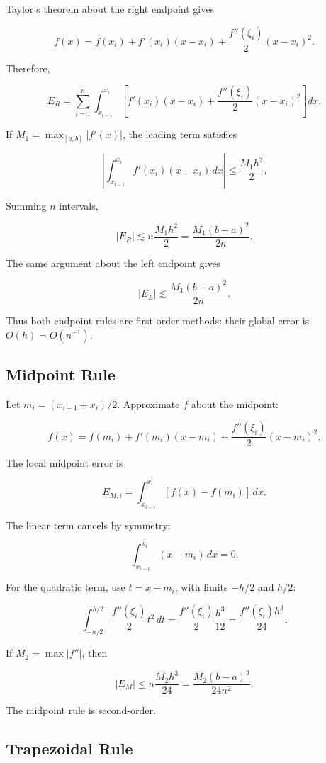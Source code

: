 \documentclass[12pt, a4paper]{article}
\theoremstyle{break}
\begin{document}
Taylor's theorem about the right endpoint gives

\[
f(x)=f(x_i)+f'(x_i)(x-x_i)+\frac{f''(\xi_i)}{2}(x-x_i)^2.
\]

Therefore,

\[
E_R=\sum_{i=1}^n\int_{x_{i-1}}^{x_i}
\left[f'(x_i)(x-x_i)+\frac{f''(\xi_i)}2(x-x_i)^2\right]dx.
\]

If \(M_1=\max_{[a,b]}|f'(x)|\), the leading term satisfies

\[
\left|\int_{x_{i-1}}^{x_i}f'(x_i)(x-x_i)\,dx\right|
\le \frac{M_1h^2}{2}.
\]

Summing \(n\) intervals,

\[
|E_R|\lesssim n\frac{M_1h^2}{2}
=\frac{M_1(b-a)^2}{2n}.
\]

The same argument about the left endpoint gives

\[
|E_L|\lesssim\frac{M_1(b-a)^2}{2n}.
\]

Thus both endpoint rules are first-order methods: their global error is \(O(h)=O(n^{-1})\).

\subsection{Midpoint Rule}\label{midpoint-rule}

Let \(m_i=(x_{i-1}+x_i)/2\). Approximate \(f\) about the midpoint:

\[
f(x)=f(m_i)+f'(m_i)(x-m_i)+\frac{f''(\xi_i)}2(x-m_i)^2.
\]

The local midpoint error is

\[
E_{M,i}=\int_{x_{i-1}}^{x_i}[f(x)-f(m_i)]\,dx.
\]

The linear term cancels by symmetry:

\[
\int_{x_{i-1}}^{x_i}(x-m_i)\,dx=0.
\]

For the quadratic term, use \(t=x-m_i\), with limits \(-h/2\) and \(h/2\):

\[
\int_{-h/2}^{h/2}\frac{f''(\xi_i)}2t^2\,dt
=\frac{f''(\xi_i)}2\frac{h^3}{12}
=\frac{f''(\xi_i)h^3}{24}.
\]

If \(M_2=\max|f''|\), then

\[
|E_M|\le n\frac{M_2h^3}{24}
=\frac{M_2(b-a)^3}{24n^2}.
\]

The midpoint rule is second-order.

\subsection{Trapezoidal Rule}\label{trapezoidal-rule}
\end{document}
